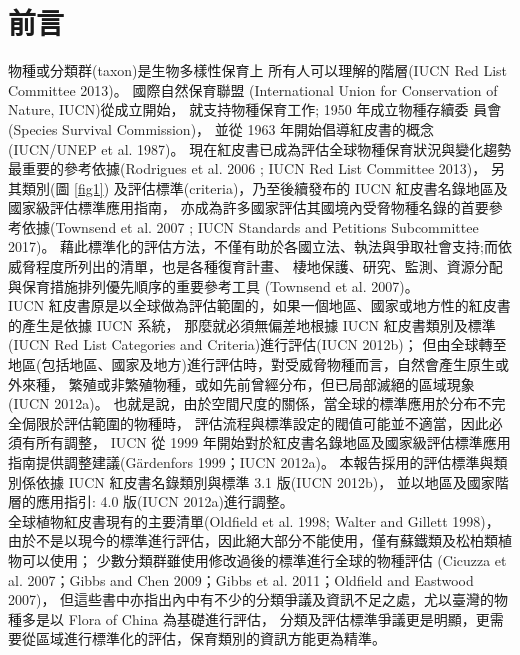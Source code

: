 \chapter{前言}

\linespread{1.5}\selectfont
\begin{multicols}{2}
物種或分類群(taxon)是生物多樣性保育上 所有人可以理解的階層(IUCN Red List Committee 2013)。
國際自然保育聯盟 (International Union for Conservation of Nature, IUCN)從成立開始，
就支持物種保育工作; 1950 年成立物種存續委 員會(Species Survival Commission)，
並從 1963 年開始倡導紅皮書的概念(IUCN/UNEP et al. 1987)。
現在紅皮書已成為評估全球物種保育狀況與變化趨勢最重要的參考依據(Rodrigues et al. 2006 ; IUCN Red List Committee 2013)，
另其類別(圖 \ref{fig1}) 及評估標準(criteria)，乃至後續發布的 IUCN 紅皮書名錄地區及國家級評估標準應用指南，
亦成為許多國家評估其國境內受脅物種名錄的首要參考依據(Townsend et al. 2007 ; IUCN Standards and Petitions Subcommittee 2017)。
藉此標準化的評估方法，不僅有助於各國立法、執法與爭取社會支持;而依威脅程度所列出的清單，也是各種復育計畫、
棲地保護、研究、監測、資源分配與保育措施排列優先順序的重要參考工具 (Townsend et al. 2007)。\\

IUCN 紅皮書原是以全球做為評估範圍的，如果一個地區、國家或地方性的紅皮書的產生是依據 IUCN 系統，
那麼就必須無偏差地根據 IUCN 紅皮書類別及標準(IUCN Red List Categories and Criteria)進行評估(IUCN 2012b)；
但由全球轉至地區(包括地區、國家及地方)進行評估時，對受威脅物種而言，自然會產生原生或外來種，
繁殖或非繁殖物種，或如先前曾經分布，但已局部滅絕的區域現象(IUCN 2012a)。
也就是說，由於空間尺度的關係，當全球的標準應用於分布不完全侷限於評估範圍的物種時，
評估流程與標準設定的閥值可能並不適當，因此必須有所有調整，
IUCN 從 1999 年開始對於紅皮書名錄地區及國家級評估標準應用指南提供調整建議(Gärdenfors 1999；IUCN 2012a)。
本報告採用的評估標準與類別係依據 IUCN 紅皮書名錄類別與標準 3.1 版(IUCN 2012b)，
並以地區及國家階層的應用指引: 4.0 版(IUCN 2012a)進行調整。\\

全球植物紅皮書現有的主要清單(Oldfield et al. 1998; Walter and Gillett 1998)，
由於不是以現今的標準進行評估，因此絕大部分不能使用，僅有蘇鐵類及松柏類植物可以使用；
少數分類群雖使用修改過後的標準進行全球的物種評估
(Cicuzza et al. 2007；Gibbs and Chen 2009；Gibbs et al. 2011；Oldfield and Eastwood 2007)，
但這些書中亦指出內中有不少的分類爭議及資訊不足之處，尤以臺灣的物種多是以 Flora of China 為基礎進行評估，
分類及評估標準爭議更是明顯，更需要從區域進行標準化的評估，保育類別的資訊方能更為精準。 \\


\end{multicols}
